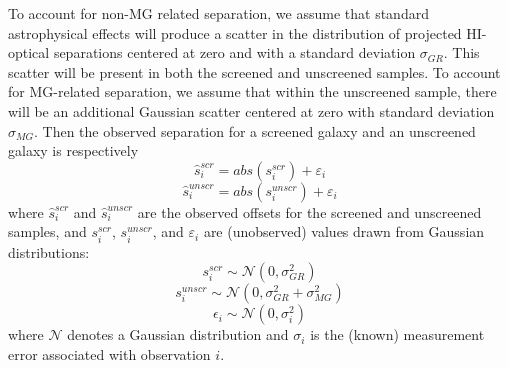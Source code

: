 \documentclass[useAMS,usenatbib,twocolumn]{mn2e}
\begin{document}
To account for non-MG related separation, we assume that standard
astrophysical effects will produce a
scatter in the distribution of projected HI-optical separations centered
at zero and with a standard deviation $\sigma_{GR}$.  This scatter will
be present in both the screened and unscreened samples.
To account for MG-related separation, we
assume that within the unscreened sample, there will be an additional
Gaussian scatter centered at zero with standard deviation $\sigma_{MG}$.
Then the observed separation for a screened galaxy and an unscreened galaxy
is respectively
\begin{equation}
  \hat{s}^{scr}_i = abs(s^{scr}_i) + \varepsilon_i \nonumber
\end{equation}
\begin{equation}
  \hat{s}^{unscr}_i = abs(s^{unscr}_i) + \varepsilon_i
\end{equation}
where $\hat{s}^{scr}_i$ and $\hat{s}^{unscr}_i$ are the observed offsets
for the screened and unscreened samples, and
 $s^{scr}_i$, $s^{unscr}_i$, and $\varepsilon_i$ are (unobserved) values
drawn from Gaussian distributions:
\begin{equation}
  s^{scr}_i \sim \mathcal{N}(0, \sigma_{GR}^2) \nonumber
\end{equation}
\begin{equation}
  s^{unscr}_i \sim \mathcal{N}(0, \sigma_{GR}^2 + \sigma_{MG}^2) \nonumber
\end{equation}
\begin{equation}
  \epsilon_i \sim \mathcal{N}(0, \sigma_i^2)
\end{equation}
where  $\mathcal{N}$ denotes a Gaussian distribution and $\sigma_i$ is the
(known)
measurement error associated with observation $i$.
\end{document}
